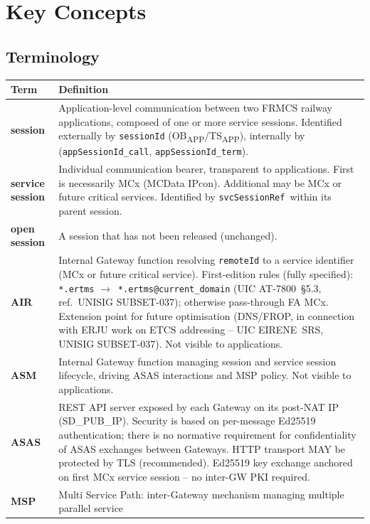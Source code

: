 \documentclass[11pt,a4paper]{article}
\newcommand{\OBAPP}{OB\textsubscript{APP}}
\newcommand{\TSAPP}{TS\textsubscript{APP}}
\newcommand{\arr}{$\to$}
\newcommand{\svcref}{\texttt{svcSessionRef}}
\newcommand{\appcall}{\texttt{appSessionId\_call}}
\newcommand{\appterm}{\texttt{appSessionId\_term}}
\begin{document}
\section{Key Concepts}

\subsection{Terminology}

\begin{longtable}{>{\bfseries}p{3.8cm} p{10.5cm}}
  \toprule Term & Definition \\ \midrule \endhead
  session & Application-level communication between two FRMCS railway applications,
    composed of one or more service sessions. Identified externally by \texttt{sessionId}
    (\OBAPP/\TSAPP), internally by (\appcall, \appterm). \\[0.3em]
  service session & Individual communication bearer, transparent to applications.
    First is necessarily MCx (MCData IPcon). Additional may be MCx or future critical
    services. Identified by \svcref\ within its parent session. \\[0.3em]
  open session & A session that has not been released (unchanged). \\[0.3em]
  AIR & Internal Gateway function resolving \texttt{remoteId} to a service identifier
    (MCx or future critical service). First-edition rules (fully specified):
    \texttt{*.ertms} \arr\ \texttt{*.ertms@current\_domain} (UIC AT-7800~§5.3,
    ref.\ UNISIG SUBSET-037); otherwise pass-through FA MCx.
    Extension point for future optimisation (DNS/FROP, in connection with ERJU work
    on ETCS addressing -- UIC EIRENE~SRS, UNISIG SUBSET-037).
    Not visible to applications. \\[0.3em]
  ASM & Internal Gateway function managing session and service session lifecycle,
    driving ASAS interactions and MSP policy. Not visible to applications. \\[0.3em]
  ASAS & REST API server exposed by each Gateway on its post-NAT IP (SD\_PUB\_IP).
    Security is based on per-message Ed25519 authentication; there is no normative
    requirement for confidentiality of ASAS exchanges between Gateways. HTTP transport
    MAY be protected by TLS (recommended). Ed25519 key exchange anchored on first MCx
    service session -- no inter-GW PKI required. \\[0.3em]
  MSP & Multi Service Path: inter-Gateway mechanism managing multiple parallel service

\end{longtable}
\end{document}

